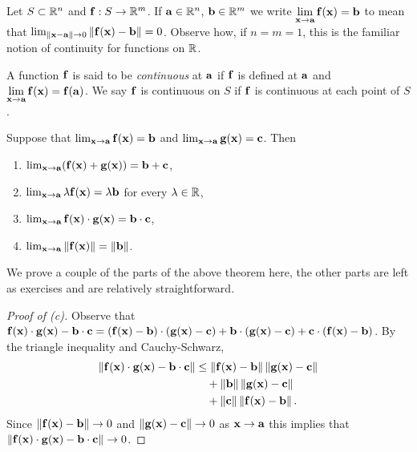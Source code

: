 Let \(S\subset \bR^n\) and \(\ff : S \to \bR^m\).
If \(\aa\in \bR^n\), \(\bb\in \bR^m\) we write
    {\(  \displaystyle\lim_{\xx \to \aa}\ff(\xx) = \bb \)}
to mean that
\(\lim_{\norm{\xx-\aa}\to 0}\norm{\ff(\xx)-\bb}=0\).
Observe how, if \(n=m=1\), this is the familiar notion of continuity for functions on \(\bR\).

\begin{definition}[continuous]
    A function \(\ff\) is said to be \emph{continuous} at \(\aa\) if \(\ff\) is defined at \(\aa\) and
    \(  \displaystyle\lim_{\xx \to \aa}\ff(\xx) = \ff(\aa)\).
    We say \(\ff\) is continuous on \(S\) if \(\ff\) is continuous at each point of \(S\).
\end{definition}

\begin{theorem}
    Suppose that \(  \lim_{\xx \to \aa}\ff(\xx) = \bb\) and \(  \lim_{\xx \to \aa}\gg(\xx) = \cc\).
    Then
    \begin{enumerate}
        \item \(  \lim_{\xx \to \aa}(\ff(\xx)+\gg(\xx)) = \bb+\cc\),
        \item \(  \lim_{\xx \to \aa} \lambda \ff(\xx) = \lambda \bb\) for every \(\lambda \in \bR\),
        \item \(  \lim_{\xx \to \aa}\ff(\xx)\cdot \gg(\xx) = \bb\cdot \cc\),
        \item \(  \lim_{\xx \to \aa} \norm{\ff(\xx)} = \norm{\bb}\).
    \end{enumerate}
\end{theorem}

We prove a couple of the parts of the above theorem here, the other parts are left as exercises and are relatively straightforward.

\begin{proof}[Proof of (c)]
    Observe that  \(
    \ff(\xx)\cdot\gg(\xx) - \bb\cdot \cc
    = (\ff(\xx)-\bb)\cdot(\gg(\xx)-\cc) + \bb\cdot(\gg(\xx)-\cc) + \cc\cdot(\ff(\xx)-\bb)
    \).
    By the triangle inequality and Cauchy-Schwarz,
    \[
        \begin{aligned}
            \norm{\ff(\xx)\cdot\gg(\xx) - \bb\cdot \cc }
             & \leq \norm{\ff(\xx)-\bb} \norm{\gg(\xx)-\cc} \\
             & \quad + \norm{\bb}\norm{\gg(\xx)-\cc}        \\
             & \quad + \norm{\cc} \norm{\ff(\xx)-\bb}.
        \end{aligned}
    \]
    Since \(\norm{\ff(\xx)-\bb} \to 0\) and \(\norm{\gg(\xx)-\cc} \to 0\) as \(\xx \to \aa\) this implies that \(\norm{\ff(\xx)\cdot\gg(\xx) - \bb\cdot \cc }\to 0\).
\end{proof}

